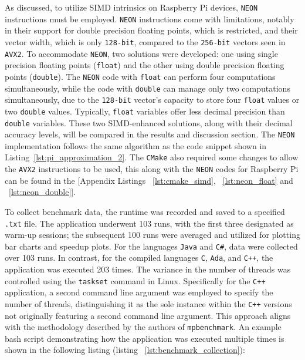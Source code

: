 As discussed, to utilize SIMD intrinsics on Raspberry Pi devices, \texttt{NEON} instructions must be employed. \texttt{NEON} instructions come with limitations, notably in their support for double precision floating points, which is restricted, and their vector width, which is only \texttt{128-bit}, compared to the \texttt{256-bit} vectors seen in \texttt{AVX2}\cite{neon_reference}. To accommodate \texttt{NEON}, two solutions were developed: one using single precision floating points (\texttt{float}) and the other using double precision floating points (\texttt{double}). The \texttt{NEON} code with \texttt{float} can perform four computations simultaneously, while the code with \texttt{double} can manage only two computations simultaneously, due to the \texttt{128-bit} vector's capacity to store four \texttt{float} values or two \texttt{double} values. Typically, \texttt{float} variables offer less decimal precision than \texttt{double} variables. These two SIMD-enhanced solutions, along with their decimal accuracy levels, will be compared in the results and discussion section. The \texttt{NEON} implementation follows the same algorithm as the code snippet shown in Listing~\ref{lst:pi_approximation_2}. The \texttt{CMake} also required some changes to allow the \texttt{AVX2} instructions to be used, this along with the \texttt{NEON} codes for Raspberry Pi can be found in the [Appendix Listings ~\ref{lst:cmake_simd}, ~\ref{lst:neon_float} and ~\ref{lst:neon_double}].

To collect benchmark data, the runtime was recorded and saved to a specified \texttt{.txt} file. The application underwent 103 runs, with the first three designated as warm-up sessions; the subsequent 100 runs were averaged and utilized for plotting bar charts and speedup plots. For the languages \texttt{Java} and \texttt{C\#}, data were collected over 103 runs. In contrast, for the compiled languages \texttt{C}, \texttt{Ada}, and \texttt{C++}, the application was executed 203 times. The variance in the number of threads was controlled using the \texttt{taskset} command in Linux. Specifically for the \texttt{C++} application, a second command line argument was employed to specify the number of threads, distinguishing it as the sole instance within the \texttt{C++} versions not originally featuring a second command line argument. This approach aligns with the methodology described by the authors of \texttt{mpbenchmark}\cite{mpbenchmark_paper}. An example bash script demonstrating how the application was executed multiple times is shown in the following listing (listing ~\ref{lst:benchmark_collection}):

